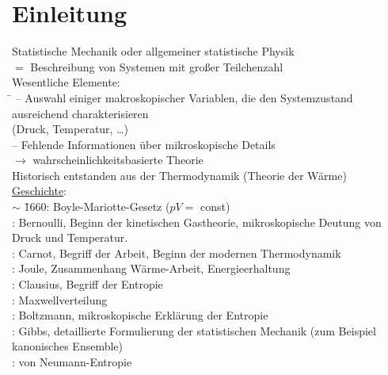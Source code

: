 \section{Einleitung}
\begin{tabbing}
Statistische Mechanik oder allgemeiner statistische Physik\\
$=$ Beschreibung von Systemen mit großer Teilchenzahl\\
Wesentliche Elemente:\\
\hspace{4em} \= \kill
--\> Auswahl einiger makroskopischer Variablen, die den Systemzustand ausreichend charakterisieren\\
\> (Druck, Temperatur, \dots)\\
--\> Fehlende Informationen über mikroskopische Details\\
$\rightarrow$\> wahrscheinlichkeitsbasierte Theorie\\
Historisch entstanden aus der Thermodynamik (Theorie der Wärme)\\
\underline{Geschichte}:\\
$\sim$ \= 1660: Boyle-Mariotte-Gesetz ($p V =$ const)\\
: Bernoulli, Beginn der kinetischen Gastheorie, mikroskopische Deutung von Druck und Temperatur.\\
: Carnot, Begriff der Arbeit, Beginn der modernen Thermodynamik\\
: Joule, Zusammenhang Wärme-Arbeit, Energieerhaltung\\
: Clausius, Begriff der Entropie\\
: Maxwellverteilung\\
: Boltzmann, mikroskopische Erklärung der Entropie\\
: Gibbs, detaillierte Formulierung der statistischen Mechanik (zum Beispiel kanonisches Ensemble)\\
: von Neumann-Entropie
\end{tabbing}
